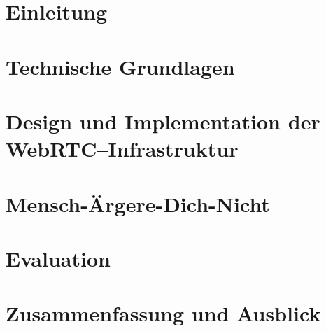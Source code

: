 \documentclass[oneside,11pt,a4paper,bibliography=totocnumbered,numbers=noenddot]{scrreprt}
\begin{document}
\chapter{Einleitung}


\chapter{Technische Grundlagen}


\chapter{Design und Implementation der WebRTC--Infrastruktur}


\chapter{Mensch-Ärgere-Dich-Nicht}


\chapter{Evaluation}
%
\chapter{Zusammenfassung und Ausblick}
%

%



\clearpage

\end{document}
